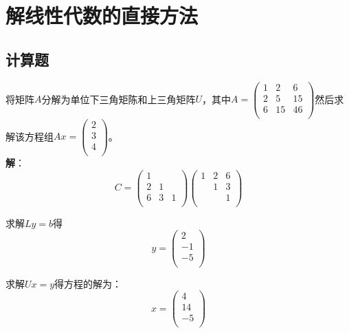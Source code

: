 \documentclass[UTF8,a4paper,11pt,oneside]{ctexbook}
\begin{document}
\chapter{解线性代数的直接方法}

\section{计算题}

将矩阵\(A\)分解为单位下三角矩陈和上三角矩阵\(U\)，其中\(A=\begin{pmatrix}
    1 & 2 & 6 \\
    2 & 5 & 15 \\
    6 & 15 & 46 \\
\end{pmatrix}\)然后求解该方程组\(Ax=\begin{pmatrix}
    2 \\
    3 \\
    4 \\
\end{pmatrix}\)。\\
\textbf{解}：
\[
C=\begin{pmatrix}
    1 & & \\
    2 & 1 & \\
    6 & 3 & 1 \\
\end{pmatrix}
\begin{pmatrix}
    1 & 2 & 6 \\
    & 1 & 3 \\
    & & 1 \\
\end{pmatrix}
\]

求解\(Ly=b\)得
\[
y=\begin{pmatrix}
    2 \\
    -1 \\
    -5 \\
\end{pmatrix}
\]

求解\(Ux=y\)得方程的解为：
\[
x=\begin{pmatrix}
    4 \\
    14 \\
    -5 \\
\end{pmatrix}
\]
\end{document}
